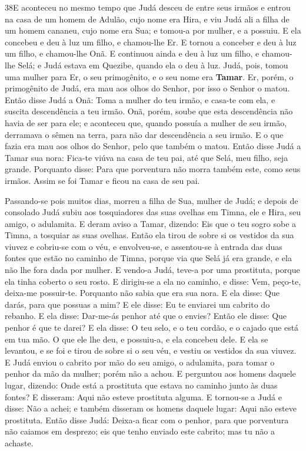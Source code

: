 \smallskip

\lettrine{38} E aconteceu no mesmo tempo que Judá desceu de
entre seus irmãos e entrou na casa de um homem de Adulão, cujo nome
era Hira, e viu Judá ali a filha de um homem cananeu, cujo nome
era Sua; e tomou-a por mulher, e a possuiu. E ela concebeu e deu
à luz um filho, e chamou-lhe Er. E tornou a conceber e deu à luz
um filho, e chamou-lhe Onã. E continuou ainda e deu à luz um
filho, e chamou-lhe Selá; e Judá estava em Quezibe, quando ela o deu
à luz. Judá, pois, tomou uma mulher para Er, o seu primogênito,
e o seu nome era \textbf{Tamar}. Er, porém, o primogênito de
Judá, era mau aos olhos do Senhor, por isso o Senhor o matou.
Então disse Judá a Onã: Toma a mulher do teu irmão, e casa-te
com ela, e suscita descendência a teu irmão. Onã, porém, soube
que esta descendência não havia de ser para ele; e aconteceu que,
quando possuía a mulher de seu irmão, derramava o sêmen na terra,
para não dar descendência a seu irmão. E o que fazia era mau
aos olhos do Senhor, pelo que também o matou. Então disse
Judá a Tamar sua nora: Fica-te viúva na casa de teu pai, até que
Selá, meu filho, seja grande. Porquanto disse: Para que porventura
não morra também este, como seus irmãos. Assim se foi Tamar e ficou
na casa de seu pai.

Passando-se pois muitos dias, morreu a filha de Sua, mulher de
Judá; e depois de consolado Judá subiu aos tosquiadores das suas
ovelhas em Timna, ele e Hira, seu amigo, o adulamita. E deram
aviso a Tamar, dizendo: Eis que o teu sogro sobe a Timna, a tosquiar
as suas ovelhas. Então ela tirou de sobre si os vestidos da
sua viuvez e cobriu-se com o véu, e envolveu-se, e assentou-se à
entrada das duas fontes que estão no caminho de Timna, porque via
que Selá já era grande, e ela não lhe fora dada por mulher. E
vendo-a Judá, teve-a por uma prostituta, porque ela tinha coberto o
seu rosto. E dirigiu-se a ela no caminho, e disse: Vem,
peço-te, deixa-me possuir-te. Porquanto não sabia que era sua nora.
E ela disse: Que darás, para que possuas a mim? E ele disse:
Eu te enviarei um cabrito do rebanho. E ela disse: Dar-me-ás penhor
até que o envies? Então ele disse: Que penhor é que te darei?
E ela disse: O teu selo, e o teu cordão, e o cajado que está em tua
mão. O que ele lhe deu, e possuiu-a, e ela concebeu dele. E
ela se levantou, e se foi e tirou de sobre si o seu véu, e vestiu os
vestidos da sua viuvez. E Judá enviou o cabrito por mão do
seu amigo, o adulamita, para tomar o penhor da mão da mulher; porém
não a achou. E perguntou aos homens daquele lugar, dizendo:
Onde está a prostituta que estava no caminho junto às duas fontes? E
disseram: Aqui não esteve prostituta alguma. E tornou-se a
Judá e disse: Não a achei; e também disseram os homens daquele
lugar: Aqui não esteve prostituta. Então disse Judá: Deixa-a
ficar com o penhor, para que porventura não caiamos em desprezo; eis
que tenho enviado este cabrito; mas tu não a achaste.

